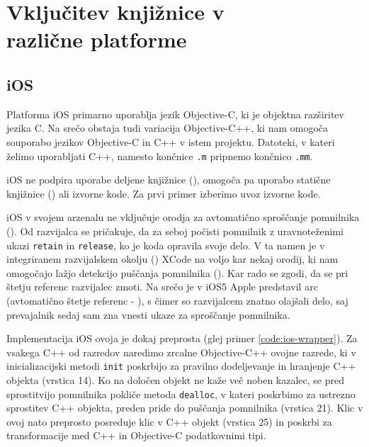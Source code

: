 \chapter[Vključitev knjižnice v različne platforme]{Vključitev knjižnice v \\ različne platforme}
\label{chap:cross-platform}

\section{iOS}

Platforma iOS primarno uporablja jezik Objective-C, ki je objektna razširitev jezika C. Na srečo obstaja tudi variacija Objective-C++, ki nam omogoča souporabo jezikov Objective-C in C++ v istem projektu. Datoteki, v kateri želimo uporabljati C++, namesto končnice \texttt{.m} pripnemo končnico \texttt{.mm}.

iOS ne podpira uporabe deljene knjižnice (), omogoča pa uporabo statične knjižnice () ali izvorne kode. Za prvi primer izberimo uvoz izvorne kode.

iOS v svojem arzenalu ne vključuje orodja za avtomatično sproščanje pomnilnika (). Od razvijalca se pričakuje, da za seboj počisti pomnilnik z uravnoteženimi ukazi \texttt{retain} in \texttt{release}, ko je koda opravila svoje delo. V ta namen je v integriranem razvijalskem okolju () XCode na voljo kar nekaj orodij, ki nam omogočajo lažjo detekcijo puščanja pomnilnika (). Kar rado se zgodi, da se pri štetju referenc razvijalec zmoti. Na srečo je v iOS5 Apple predstavil \gls{arc} (avtomatično štetje referenc - ), s čimer so razvijalcem znatno olajšali delo, saj prevajalnik sedaj sam zna vnesti ukaze za sproščanje pomnilnika.

Implementacija iOS ovoja je dokaj preprosta (glej primer \ref{code:ios-wrapper}). Za vsakega C++ od razredov naredimo zrcalne Objective-C++ ovojne razrede, ki v inicializacijski metodi \texttt{init} poskrbijo za pravilno dodeljevanje in hranjenje C++ objekta (vrstica 14). Ko na določen objekt ne kaže več noben kazalec, se pred sprostitvijo pomnilnika pokliče metoda \texttt{dealloc}, v kateri poskrbimo za ustrezno sprostitev C++ objekta, preden pride do puščanja pomnilnika (vrstica 21). Klic v ovoj nato preprosto posreduje klic v C++ objekt (vrstica 25) in poskrbi za transformacije med C++ in Objective-C podatkovnimi tipi.


